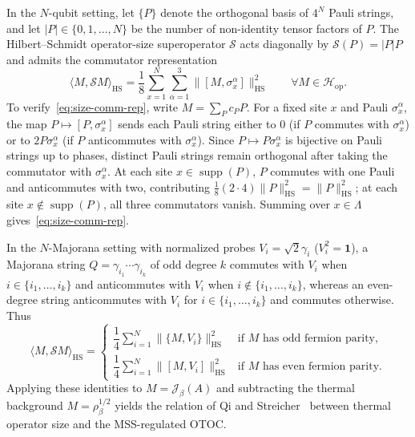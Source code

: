 \documentclass[11pt,a4paper]{article}
\numberwithin{equation}{section}
\theoremstyle{plain}
\theoremstyle{definition}
\newcommand{\Hop}{\mathcal{H}_{\mathrm{op}}}
\newcommand{\HS}{\mathrm{HS}}
\newcommand{\supp}{\operatorname{supp}}
\begin{document}
In the $N$-qubit setting, let $\{P\}$ denote the orthogonal basis of $4^N$ Pauli strings, and let $|P|\in\{0,1,\dots,N\}$ be the number of non-identity tensor factors of $P$. The Hilbert--Schmidt operator-size superoperator $\mathcal{S}$ acts diagonally by $\mathcal{S}(P) = |P|P$ and admits the commutator representation
\begin{equation}\label{eq:size-comm-rep}
  \langle M,\mathcal{S}M\rangle_\HS = \frac{1}{8}\sum_{x=1}^N\sum_{\alpha=1}^3 \bigl\|[M,\sigma_x^\alpha]\bigr\|_\HS^2 \qquad \forall M\in\Hop.
\end{equation}
To verify~\eqref{eq:size-comm-rep}, write $M = \sum_P c_P P$. For a fixed site $x$ and Pauli $\sigma_x^\alpha$, the map $P\mapsto [P,\sigma_x^\alpha]$ sends each Pauli string either to $0$ (if $P$ commutes with $\sigma_x^\alpha$) or to $2P\sigma_x^\alpha$ (if $P$ anticommutes with $\sigma_x^\alpha$). Since $P\mapsto P\sigma_x^\alpha$ is bijective on Pauli strings up to phases, distinct Pauli strings remain orthogonal after taking the commutator with $\sigma_x^\alpha$. At each site $x\in\supp(P)$, $P$ commutes with one Pauli and anticommutes with two, contributing $\frac{1}{8}(2\cdot 4)\|P\|_\HS^2 = \|P\|_\HS^2$; at each site $x\notin\supp(P)$, all three commutators vanish. Summing over $x\in\Lambda$ gives~\eqref{eq:size-comm-rep}.

In the $N$-Majorana setting with normalized probes $V_i = \sqrt{2}\gamma_i$ ($V_i^2 = \mathbf{1}$), a Majorana string $Q = \gamma_{i_1}\cdots\gamma_{i_k}$ of odd degree $k$ commutes with $V_i$ when $i\in\{i_1,\dots,i_k\}$ and anticommutes with $V_i$ when $i\notin\{i_1,\dots,i_k\}$, whereas an even-degree string anticommutes with $V_i$ for $i\in\{i_1,\dots,i_k\}$ and commutes otherwise. Thus
\[
  \langle M,\mathcal{S}M\rangle_\HS =
  \begin{cases}
    \dfrac{1}{4}\displaystyle\sum_{i=1}^N \|\{M,V_i\}\|_\HS^2 & \text{if $M$ has odd fermion parity},\\[10pt]
    \dfrac{1}{4}\displaystyle\sum_{i=1}^N \|[M,V_i]\|_\HS^2 & \text{if $M$ has even fermion parity}.
  \end{cases}
\]
Applying these identities to $M = \mathcal{J}_\beta(A)$ and subtracting the thermal background $M = \rho_\beta^{1/2}$ yields the relation of Qi and Streicher~\cite{Qi2019} between thermal operator size and the MSS-regulated OTOC.
\end{document}
